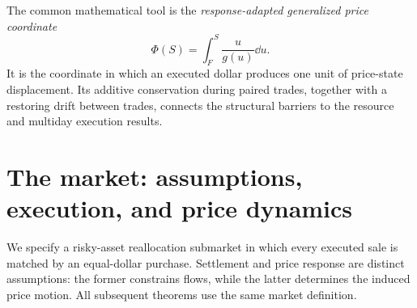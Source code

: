 \documentclass[review,hidelinks,onefignum,onetabnum]{siamonline250211}
\begin{document}
The common mathematical tool is the \emph{response-adapted generalized price coordinate}
\begin{equation}\label{eq:phi-intro}
\Phi(S)=\int_F^S\frac{u}{g(u)}\dd u.
\end{equation}
It is the coordinate in which an executed dollar produces one unit of price-state displacement. Its additive conservation during paired trades, together with a restoring drift between trades, connects the structural barriers to the resource and multiday execution results.

\section{The market: assumptions, execution, and price dynamics}\label{sec:micro}\label{sec:model}
We specify a risky-asset reallocation submarket in which every executed sale is matched by an equal-dollar purchase. Settlement and price response are distinct assumptions: the former constrains flows, while the latter determines the induced price motion. All subsequent theorems use the same market definition.
\end{document}
